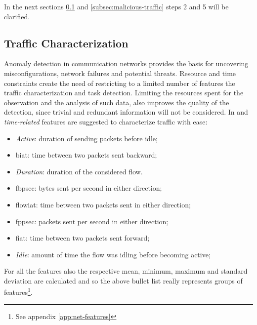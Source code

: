 \noindent In the next sections \ref{subsec:traffic-characterization} and \ref{subsec:malicious-traffic} steps 2 and 5 will be clarified.



\subsection{Traffic Characterization}
\label{subsec:traffic-characterization}

Anomaly detection in communication networks provides the basis for uncovering misconfigurations, network failures and potential threats. Resource and time constraints create the need of restricting to a limited number of features the traffic characterization and task detection. Limiting the resources spent for the observation and the analysis of such data, also improves the quality of the detection, since trivial and redundant information will not be considered. In \cite{icissp17} and \cite{icissp18} \textit{time-related} features are suggested to characterize traffic with ease:
\begin{itemize}
    \item[\faCaretRight] \textit{Active}: duration of sending packets before idle;
    \item[\faCaretRight] \gls{biat}: time between two packets sent backward;
    \item[\faCaretRight] \textit{Duration}: duration of the considered flow.
    \item[\faCaretRight] \gls{fbpsec}: bytes sent per second in either direction;
    \item[\faCaretRight] \gls{flowiat}: time between two packets sent in either direction; 
    \item[\faCaretRight] \gls{fppsec}: packets sent per second in either direction;
    \item[\faCaretRight] \gls{fiat}: time between two packets sent forward; 
    \item[\faCaretRight] \textit{Idle}: amount of time the flow was idling before becoming active;
\end{itemize}
For all the features also the respective mean, minimum, maximum and standard deviation are calculated and so the above bullet list really represents groups of features\footnote{See appendix \ref{app:net-features}}.

